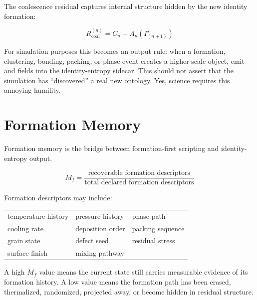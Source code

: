 \documentclass[11pt,a4paper]{article}
\begin{document}
The coalescence residual captures internal structure hidden by the new identity formation:

\begin{eqbox}
\[R_{\text{coal}}^{(n)}=C_n-A_n\!\left(I^{\star}_{(n+1)}\right)\]
\end{eqbox}

For simulation purposes this becomes an output rule: when a formation, clustering, bonding,
packing, or phase event creates a higher-scale object, emit  and
 fields into the identity-entropy sidecar. This should not assert that the
simulation has ``discovered'' a real new ontology. Yes, science requires this annoying humility.

\section{Formation Memory}

Formation memory is the bridge between formation-first scripting and identity-entropy output.

\begin{eqbox}
\[M_f=\frac{\text{recoverable formation descriptors}}{\text{total declared formation descriptors}}\]
\end{eqbox}

Formation descriptors may include:

\vspace{4pt}
\begin{center}\small
\begin{tabular}{@{}lll@{}}
temperature history & pressure history    & phase path \\
cooling rate        & deposition order    & packing sequence \\
grain state         & defect seed         & residual stress \\
surface finish      & mixing pathway      & \\
\end{tabular}
\end{center}
\vspace{4pt}

A high $M_f$ value means the current state still carries measurable evidence of its formation
history. A low value means the formation path has been erased, thermalized, randomized,
projected away, or become hidden in residual structure.
\end{document}
